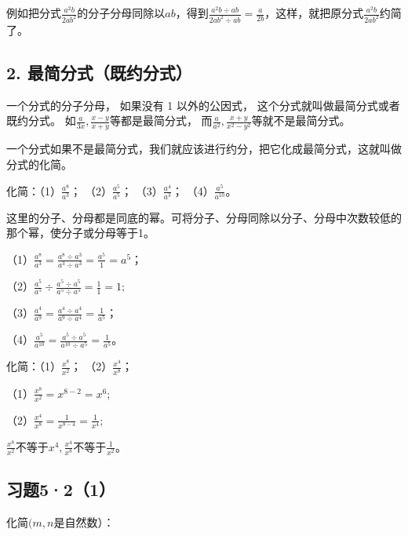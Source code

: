 例如把分式\(\frac{a^2b}{2ab^2}\)的分子分母同除以\(ab\)，得到\(\frac{a^2b \div ab}{2ab^2 \div ab} = \frac{a}{2b}\)，这样，就把原分式\(\frac{a^2b}{2ab^2}\)约简了。

\subsection{2. 最简分式（既约分式）}

一个分式的分子分母， 如果没有 1 以外的公因式，
这个分式就叫做最简分式或者既约分式。
如\(\frac{a}{3x}, \frac{x - y}{x + y}\)等都是最简分式，
而\(\frac{a}{a^2}, \frac{x + y}{x^2 - y^2}\)等就不是最简分式。

一个分式如果不是最简分式，我们就应该进行约分，把它化成最简分式，这就叫做分式的化简。

 化简：（1）\(\frac{a^8}{a^3}\)； （2）\(\frac{a^5}{a^5}\)；
（3）\(\frac{a^4}{a^3}\)； （4）\(\frac{a^5}{a^{10}}\)。

这里的分子、分母都是同底的幂。可将分子、分母同除以分子、分母中次数较低的那个幂，使分子或分母等于1。

（1）\(\frac{a^8}{a^3} = \frac{a^8 \div a^3}{a^3 \div a^3} = \frac{a^5}{1} = a^5\)；

（2）\(\frac{a^5}{a^5} \div \frac{a^5 \div a^5}{a^5 \div a^5} = \frac{1}{1} = 1;\)

（3）\(\frac{a^4}{a^9} = \frac{a^4 \div a^4}{a^9 \div a^4} = \frac{1}{a^5}\)；

（4）\(\frac{a^5}{a^{10}} = \frac{a^5 \div a^5}{a^{10} \div a^5} = \frac{1}{a^5}\)。

 化简：（1）\(\frac{x^8}{x^2}\)； （2）\(\frac{x^4}{x^8}\)；

 （1）\(\frac{x^8}{x^2} = x^{8 - 2} = x^6;\)

（2）\(\frac{x^4}{x^8} = \frac{1}{x^{8 - 4}} = \frac{1}{x^{4}};\)

\(\frac{x^8}{x^2}\)不等于\(x^4, \frac{x^4}{x^8}\)不等于\(\frac{1}{x^2}\)。

\subsection{习题5·2（1）}

化简\((m, n\)是自然数）：

